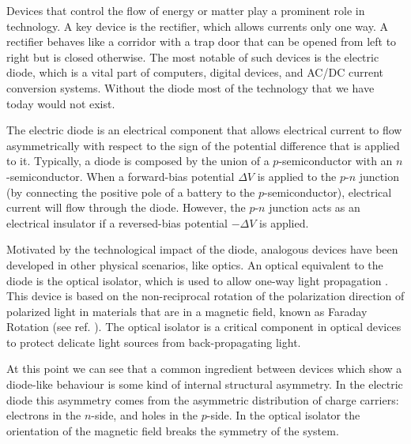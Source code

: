 
\label{Introduction}

Devices that control the flow of energy or matter play a prominent role in technology. A key device is the rectifier, which allows currents only one way. A rectifier behaves like a corridor with a trap door that can be opened from left to right but is closed otherwise. The most notable of such devices is the electric diode, which is a vital part of computers, digital devices, and AC/DC current conversion systems. Without the diode most of the technology that we have today would not exist.

The electric diode is an electrical component that allows electrical current to flow asymmetrically with respect to the sign of the potential difference that is applied to it. Typically, a diode is composed by the union of a $p$-semiconductor with an $n$-semiconductor. When a forward-bias potential $\Delta V$ is applied to the $p$-$n$ junction (by connecting the positive pole of a battery to the $p$-semiconductor), electrical current will flow through the diode. However, the $p$-$n$ junction acts as an electrical insulator if a reversed-bias potential $-\Delta V$ is applied.

Motivated by the technological impact of the diode, analogous devices have been developed in other physical scenarios, like optics. An optical equivalent to the diode is the optical isolator, which is used to allow one-way light propagation \cite{Saleh1991}. This device is based on the non-reciprocal rotation of the polarization direction of polarized light in materials that are in a magnetic field, known as Faraday Rotation (see ref. \cite{Yariv1984}). The optical isolator is a critical component in optical devices to protect delicate light sources from back-propagating light.

At this point we can see that a common ingredient between devices which show a diode-like behaviour is some kind of internal structural asymmetry. In the electric diode this asymmetry comes from the asymmetric distribution of charge carriers: electrons in the $n$-side, and holes in the $p$-side. In the optical isolator the orientation of the magnetic field breaks the symmetry of the system.

